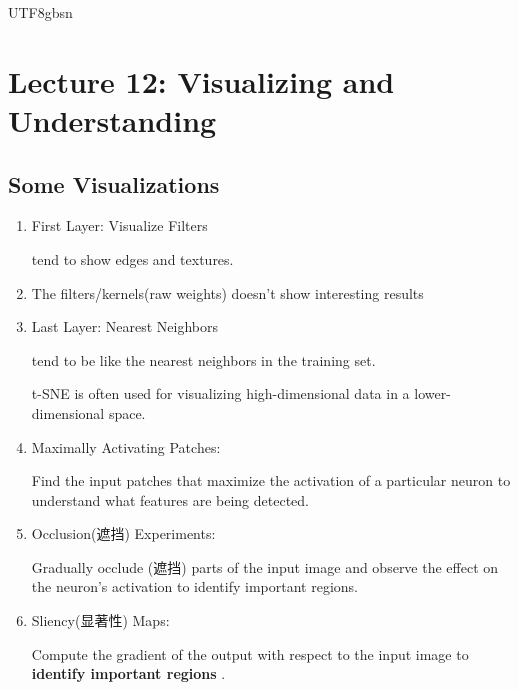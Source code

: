 \documentclass{article}
\numberwithin{equation}{section}
\begin{document}
\begin{CJK}{UTF8}{gbsn}
\section*{Lecture 12: Visualizing and Understanding}
\setcounter{section}{12}
\setcounter{subsection}{0}
\setcounter{equation}{0}

\subsection{Some Visualizations}
\begin{enumerate}
    \item First Layer: Visualize Filters\par
    tend to show edges and textures.
    \item The filters/kernels(raw weights) doesn't show interesting results
    \item Last Layer: Nearest Neighbors\par
    tend to be like the nearest neighbors in the training set.\par
    t-SNE is often used for visualizing high-dimensional data in a lower-dimensional space.
    \item Maximally Activating Patches:\par
    Find the input patches that maximize the activation of a particular neuron to understand what features are being detected.\par
    \item Occlusion(遮挡) Experiments:\par
    Gradually occlude (遮挡) parts of the input image and observe the effect on the neuron's activation to identify important regions.
    \item Sliency(显著性) Maps:\par
    Compute the gradient of the output with respect to the input image to \textbf{identify important regions} .
\end{enumerate}



\end{CJK}
\end{document}
